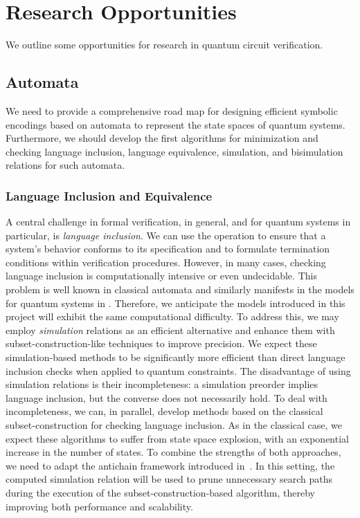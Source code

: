 \section{Research Opportunities}
\label{opportunities:section}
We outline some opportunities for research in quantum circuit verification.

\subsection{Automata}
\label{automata:subsection}
We need to provide a comprehensive road map for designing efficient symbolic encodings based on automata to represent the state spaces of quantum systems.
%
Furthermore, we should develop the first algorithms for minimization and checking language inclusion, language equivalence, simulation, and bisimulation
relations for such automata.
%

\subsubsection{Language Inclusion and Equivalence}
A central challenge in formal verification, in general, and for quantum systems in particular, is \textit{language inclusion}.
%
We can use the operation to ensure that a system's behavior conforms to its specification and to formulate termination conditions within verification procedures.
%
However, in many cases, checking language inclusion is computationally intensive or even undecidable.
%
This problem is well known in classical automata and similarly manifests in the models for quantum systems in \cite{DBLP:journals/pacmpl/AbdullaCCHLLLT25}.
%
Therefore, we anticipate the models introduced in this project will exhibit the same computational difficulty.
%
To address this, we may employ \textit{simulation} relations as an efficient alternative and enhance them with subset-construction-like techniques to improve precision.
%
We expect these simulation-based methods to be significantly more efficient than direct language inclusion checks when applied to quantum constraints.
%
%
The disadvantage of using simulation relations is their incompleteness: a simulation preorder implies language inclusion, but the converse does not necessarily hold.
%
To deal with incompleteness, we can, in parallel, develop methods based on the classical subset-construction for checking language inclusion.
%
As in the classical case, we expect these algorithms to suffer from state space explosion, with an exponential increase in the number of states.
%
To combine the strengths of both approaches, we need to adapt the antichain framework introduced in~\cite{wulfantichains,DBLP:conf/tacas/AbdullaCHMV10}.
%
In this setting, the computed simulation relation will be used to prune unnecessary search paths during the execution of the subset-construction-based algorithm, thereby improving both performance and scalability.
%

